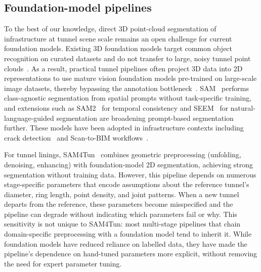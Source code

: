 \documentclass[a4paper,fleqn]{cas-dc}
\begin{document}
\subsection{Foundation-model pipelines}

To the best of our knowledge, direct 3D point-cloud segmentation of infrastructure at tunnel scene scale remains an open challenge for current foundation models. Existing 3D foundation models target common object recognition on curated datasets and do not transfer to large, noisy tunnel point clouds~\cite{camuffo2022recent, liu2023openshape, guo2023pointbind, xu2024pointllm}. As a result, practical tunnel pipelines often project 3D data into 2D representations to use mature vision foundation models pre-trained on large-scale image datasets, thereby bypassing the annotation bottleneck~\cite{caron2021dino, franceschelli2024training}. SAM~\cite{kirillov2023sam} performs class-agnostic segmentation from spatial prompts without task-specific training, and extensions such as SAM2~\cite{ravi2024sam2} for temporal consistency and SEEM~\cite{zou2023segment} for natural-language-guided segmentation are broadening prompt-based segmentation further. These models have been adopted in infrastructure contexts including crack detection~\cite{ge2024cracksam} and Scan-to-BIM workflows~\cite{wang2024omni, pan2024zero}.

For tunnel linings, SAM4Tun~\cite{ye2025sam4tun} combines geometric preprocessing (unfolding, denoising, enhancing) with foundation-model 2D segmentation, achieving strong segmentation without training data. However, this pipeline depends on numerous stage-specific parameters that encode assumptions about the reference tunnel's diameter, ring length, point density, and joint patterns. When a new tunnel departs from the reference, these parameters become misspecified and the pipeline can degrade without indicating which parameters fail or why. This sensitivity is not unique to SAM4Tun: most multi-stage pipelines that chain domain-specific preprocessing with a foundation model tend to inherit it. While foundation models have reduced reliance on labelled data, they have made the pipeline's dependence on hand-tuned parameters more explicit, without removing the need for expert parameter tuning.
\end{document}
